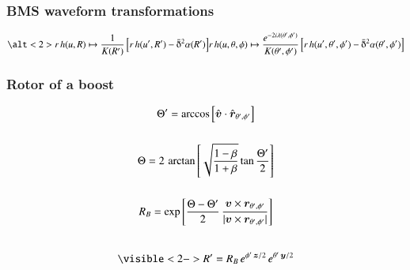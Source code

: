 \documentclass[12pt,xcolor={dvipsnames}]{beamer}
\renewcommand{\vec}{\bm}
\renewcommand{\vec}[1]{\boldsymbol{#1}}
\begin{document}


\begin{frame}
  \frametitle{BMS waveform transformations}
  \begin{equation*}
    \alt<2> %
    {r\, h(u, R) \mapsto \frac{1 \vphantom{e^{2}}} {K(R')} \left[ r\,
        h(u', R') - \bar{\eth}^{2} \alpha(R') \right]} %
    {r\, h(u, \theta, \phi) \mapsto \frac{e^{-2i \lambda(\theta', \phi')}}
      {K(\theta', \phi')} \left[ r\, h(u', \theta', \phi') -
        \bar{\eth}^{2} \alpha(\theta', \phi') \right]} %
  \end{equation*}
\end{frame}

\begin{frame}
  \frametitle{Rotor of a boost}
  \vspace{-0.3in}
  \begin{gather*}
    \Theta' = \arccos \left[ \hat{\vec{v}} \cdot
      \hat{\vec{r}}_{\theta', \phi'} \right]
    \\[15pt]
    \Theta = 2\, \arctan \left[ \sqrt{ \frac{1-\beta} {1+\beta} } \tan
      \frac{\Theta'}{2} \right]
    \\[15pt]
    R_{B} = \exp \left[ \frac{\Theta - \Theta'} {2}\, \frac{\vec{v}
        \times \vec{r}_{\theta', \phi'} } {\lvert \vec{v} \times
        \vec{r}_{\theta', \phi'} \rvert} \right]
    \\[20pt]
    \visible<2->{R' = R_{B}\, e^{\phi'\, \vec{z}/2}\, e^{\theta'\,
        \vec{y}/2}}
  \end{gather*}
\end{frame}

\end{document}
